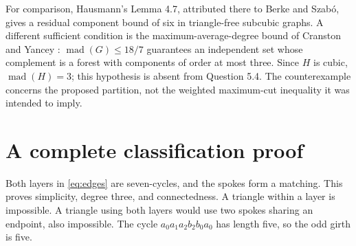 \documentclass[11pt]{article}
\begin{document}
For comparison, Hausmann's Lemma 4.7, attributed there to Berke and
Szab\'o, gives a residual component bound of six in triangle-free
subcubic graphs. A different sufficient condition is the maximum-average-degree
bound of Cranston and Yancey \cite[Theorem 1, $k=3$]{cranston}:
$\operatorname{mad}(G)\leq18/7$ guarantees an independent set whose
complement is a forest with components of order at most three.
Since $H$ is cubic, $\operatorname{mad}(H)=3$; this hypothesis is absent
from Question 5.4. The counterexample concerns the proposed partition,
not the weighted maximum-cut inequality it was intended to imply.

\section{A complete classification proof}
Both layers in \eqref{eq:edges} are seven-cycles, and the spokes form
a matching. This proves simplicity, degree three, and connectedness.
A triangle within a layer is impossible. A triangle using both layers
would use two spokes sharing an endpoint, also impossible. The cycle
$a_0a_1a_2b_2b_0a_0$ has length five, so the odd girth is five.
\end{document}
